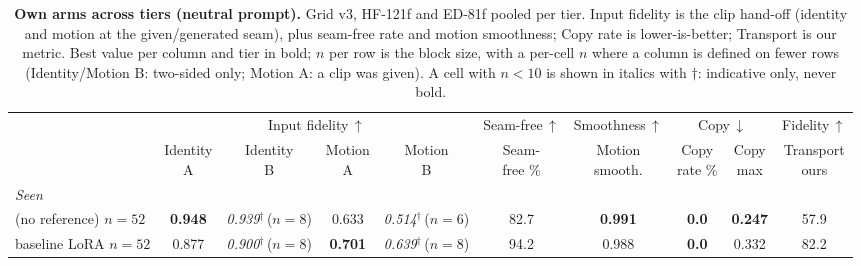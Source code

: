 \begin{table}[H]
    \centering
    \caption{\textbf{Own arms across tiers (neutral prompt).} Grid v3, HF-121f and ED-81f pooled per tier. Input fidelity is the clip hand-off (identity and motion at the given/generated seam), plus seam-free rate and motion smoothness; Copy rate is lower-is-better; Transport is our metric. Best value per column and tier in bold; $n$ per row is the block size, with a per-cell $n$ where a column is defined on fewer rows (Identity/Motion B: two-sided only; Motion A: a clip was given). A cell with $n<10$ is shown in italics with $\dagger$: indicative only, never bold.}
    \label{tab:gridv3_own}
    \footnotesize
    \setlength{\tabcolsep}{2.5pt}
    \begin{tabular}{lccccccccc}
        \toprule
        & \multicolumn{4}{c}{Input fidelity\,$\uparrow$} & Seam-free\,$\uparrow$ & Smoothness\,$\uparrow$ & \multicolumn{2}{c}{Copy\,$\downarrow$} & Fidelity\,$\uparrow$ \\
        \cmidrule(lr){2-5}\cmidrule(lr){6-6}\cmidrule(lr){7-7}\cmidrule(lr){8-9}\cmidrule(lr){10-10}
        & \shortstack{Identity\\A} & \shortstack{Identity\\B} & \shortstack{Motion\\A} & \shortstack{Motion\\B} & \shortstack{Seam-\\free \%} & \shortstack{Motion\\smooth.} & \shortstack{Copy\\rate \%} & \shortstack{Copy\\max} & \shortstack{Transport\\ours} \\
        \midrule
        \multicolumn{10}{l}{\emph{Seen}} \\
        \ltx{} (no reference) {\tiny\color{gray}$n{=}52$} & \textbf{0.948} & \textit{0.939}$^{\dagger}${\tiny\,($n{=}8$)} & 0.633 & \textit{0.514}$^{\dagger}${\tiny\,($n{=}6$)} & 82.7 & \textbf{0.991} & \textbf{0.0} & \textbf{0.247} & 57.9 \\
        \ltx{} baseline LoRA {\tiny\color{gray}$n{=}52$} & 0.877 & \textit{0.900}$^{\dagger}${\tiny\,($n{=}8$)} & \textbf{0.701} & \textit{0.639}$^{\dagger}${\tiny\,($n{=}8$)} & 94.2 & 0.988 & \textbf{0.0} & 0.332 & 82.2 \\

\end{tabular}
\end{table}
